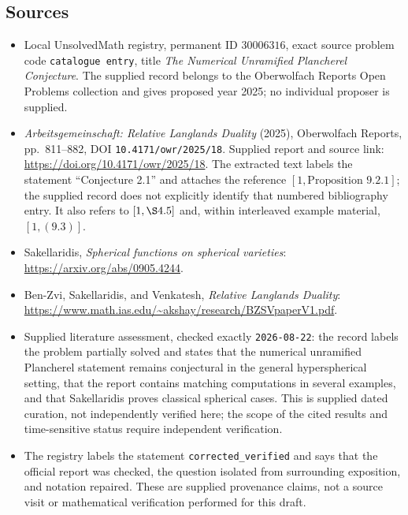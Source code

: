 \documentclass[11pt]{article}
\begin{document}
\subsection{Sources}
\begin{itemize}
\item Local UnsolvedMath registry, permanent ID \(30006316\), exact source problem code \texttt{catalogue entry}, title \emph{The Numerical Unramified Plancherel Conjecture}. The supplied record belongs to the Oberwolfach Reports Open Problems collection and gives proposed year 2025; no individual proposer is supplied.
\item \emph{Arbeitsgemeinschaft: Relative Langlands Duality} (2025), Oberwolfach Reports, pp.~811--882, DOI \texttt{10.4171/owr/2025/18}. Supplied report and source link: \url{https://doi.org/10.4171/owr/2025/18}. The extracted text labels the statement ``Conjecture 2.1'' and attaches the reference \([1,\text{Proposition }9.2.1]\); the supplied record does not explicitly identify that numbered bibliography entry. It also refers to \([1,\S4.5]\) and, within interleaved example material, \([1,(9.3)]\).
\item Sakellaridis, \emph{Spherical functions on spherical varieties}: \url{https://arxiv.org/abs/0905.4244}.
\item Ben-Zvi, Sakellaridis, and Venkatesh, \emph{Relative Langlands Duality}: \url{https://www.math.ias.edu/~akshay/research/BZSVpaperV1.pdf}.
\item Supplied literature assessment, checked exactly \texttt{2026-08-22}: the record labels the problem partially solved and states that the numerical unramified Plancherel statement remains conjectural in the general hyperspherical setting, that the report contains matching computations in several examples, and that Sakellaridis proves classical spherical cases. This is supplied dated curation, not independently verified here; the scope of the cited results and time-sensitive status require independent verification.
\item The registry labels the statement \texttt{corrected\_verified} and says that the official report was checked, the question isolated from surrounding exposition, and notation repaired. These are supplied provenance claims, not a source visit or mathematical verification performed for this draft.
\end{itemize}
\end{document}
